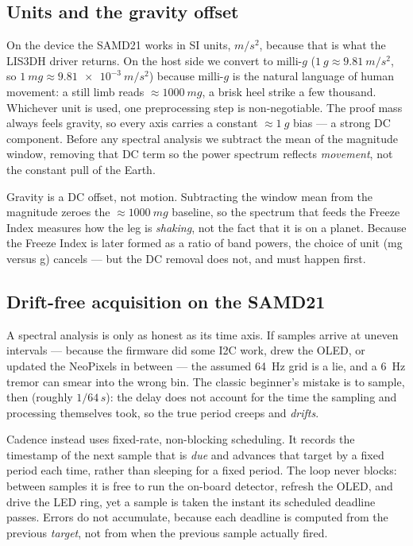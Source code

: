 \subsection{Units and the gravity offset}

On the device the SAMD21 works in SI units, $\si{m/s^2}$, because that is what the
LIS3DH driver returns. On the host side we convert to milli-$g$ ($\SI{1}{g}\approx
\SI{9.81}{m/s^2}$, so $\SI{1}{mg}\approx\SI{9.81e-3}{m/s^2}$) because milli-$g$ is the
natural language of human movement: a still limb reads $\approx\SI{1000}{mg}$, a brisk
heel strike a few thousand. Whichever unit is used, one preprocessing step is
non-negotiable. The proof mass always feels gravity, so every axis carries a constant
$\approx\SI{1}{g}$ bias --- a strong DC component. Before any spectral analysis we
subtract the mean of the magnitude window, removing that DC term so the power spectrum
reflects \emph{movement}, not the constant pull of the Earth.

\begin{keyidea}
Gravity is a DC offset, not motion. Subtracting the window mean from the magnitude
zeroes the $\approx\SI{1000}{mg}$ baseline, so the spectrum that feeds the Freeze
Index measures how the leg is \emph{shaking}, not the fact that it is on a planet.
Because the Freeze Index is later formed as a ratio of band powers, the choice of
unit (mg versus g) cancels --- but the DC removal does not, and must happen first.
\end{keyidea}

\subsection{Drift-free acquisition on the SAMD21}

A spectral analysis is only as honest as its time axis. If samples arrive at uneven
intervals --- because the firmware did some I2C work, drew the OLED, or updated the
NeoPixels in between --- the assumed \SI{64}{Hz} grid is a lie, and a \SI{6}{Hz}
tremor can smear into the wrong bin. The classic beginner's mistake is to sample,
then  (roughly $1/64\,\si{s}$): the delay does not account for the
time the sampling and processing themselves took, so the true period creeps and
\emph{drifts}.

Cadence instead uses fixed-rate, non-blocking scheduling. It records the timestamp of
the next sample that is \emph{due} and advances that target by a fixed period each
time, rather than sleeping for a fixed period. The loop never blocks: between samples
it is free to run the on-board detector, refresh the OLED, and drive the LED ring,
yet a sample is taken the instant its scheduled deadline passes. Errors do not
accumulate, because each deadline is computed from the previous \emph{target}, not
from when the previous sample actually fired.

